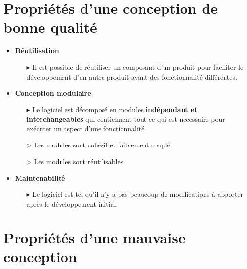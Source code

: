 \documentclass[16pt]{report}
\begin{document}
\begin{multicols*}{2}
        \section{Propriétés d'une conception de bonne qualité}
        \begin{itemize}
            \item \textbf{Réutilisation}  
                \begin{itemize}
                    \item[$\blacktriangleright$] Il est possible de réutiliser un composant d'un produit 
                        pour faciliter le développement d'un autre produit ayant des fonctionnalité différentes.
                \end{itemize}
            \item \textbf{Conception modulaire}  
                \begin{itemize}
                    \item[$\blacktriangleright$] 
                        Le logiciel est décomposé en modules \textbf{indépendant et interchangeables} qui contiennent
                        tout ce qui est nécessaire pour exécuter un aspect d'une fonctionnalité. 
                    \item[$\rhd$] Les modules sont cohésif et faiblement couplé
                    \item[$\rhd$] Les modules sont réutilisables
                \end{itemize}
            \item \textbf{Maintenabilité}   
                \begin{itemize}
                    \item[$\blacktriangleright$] Le logiciel est tel qu'il n'y a pas beaucoup de modifications à 
                        apporter après le développement initial. 
                \end{itemize}
       \end{itemize}       

       \section{Propriétés d'une mauvaise conception}
                

\end{multicols*}
\end{document}
